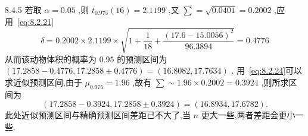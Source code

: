 \begin{example}{}{8.4.5}
    若取 $\alpha=0.05$ ,则 $t_{0.975}(16)=2.1199$ ,又 $\hat{\sum}=\sqrt{0.0401}=0.2002$ ,应用~\ref{eq:8.2.21}
    \begin{equation}
    \delta=0.2002 \times 2.1199 \times \sqrt{1+\frac{1}{18}+\frac{(17.6-15.0056)^{2}}{96.3894}}=0.4776
    \end{equation}
    从而该动物体积的概率为 $0.95$ 的预测区间为
 $(17.2858-0.4776,17.2858\pm 0.4776)=(16.8082,17.7634)$ .
    用~\ref{eq:8.2.24}可以求近似预测区间,由于 $\mu_{0.975}=1.96$ ,故有 $\sum \sim 1.96\times 0.2002=0.3924$ ,则所求区间为
    \begin{equation}
    (17.2858-0.392 4,17.2858\pm 0.3924)=(16.8934,17.6782).
    \end{equation}
    此处近似预测区间与精确预测区间差距已不大了,当 $n$ 更大一些,两者差距会更小一些.
\end{example}

